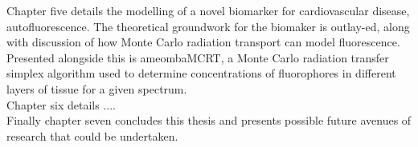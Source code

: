 Chapter five details the modelling of a novel biomarker for cardiovascular disease, autofluorescence.
The theoretical groundwork for the biomaker is outlay-ed, along with discussion of how Monte Carlo radiation transport can model fluorescence.
Presented alongside this is ameombaMCRT, a Monte Carlo radiation transfer simplex algorithm used to determine concentrations of fluorophores in different layers of tissue for a given spectrum.\\
Chapter six details ....\\


Finally chapter seven concludes this thesis and presents possible future avenues of research that could be undertaken.